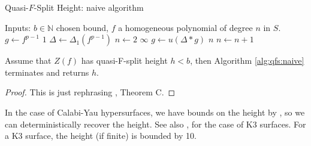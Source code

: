 \begin{algorithm}[H]
\caption{Quasi-\(F\)-Split Height: naive algorithm}
\label{alg:qfs:naive}
\begin{algorithmic}[1]
\State Inputs: \(b \in \mathbb{N}\) chosen bound, \(f\) a homogeneous
	polynomial of degree \(n\) in \(S\).
\State \(g \gets f^{p-1}\) 
    \State \Return \(1\) 
\EndIf
\State \(\Delta \gets \Delta_{1}(f^{p-1})\) 
\State \(n \gets 2\) 
        \State \Return \(\infty\)
    \EndIf
    \State \(g \gets u(\Delta * g)\) 
        \State \Return \(n\) 
    \EndIf
    \State \(n \gets n + 1\)
\EndWhile
\end{algorithmic}
\end{algorithm}

%

\begin{thm}
	Assume that
	\(Z(f)\) has quasi-F-split height \(h < b\),
	then Algorithm \ref{alg:qfs:naive} terminates
	and returns \(h\).
\end{thm}

\begin{proof}
	This is just rephrasing \cite{kty-2022-fedder}, Theorem C.
\end{proof}

In the case of Calabi-Yau hypersurfaces, we have bounds on the height by
\cite{van-der-geer-katsura-2003-calabi-yau},
so we can deterministically recover the height.  
See also \cite[Theorem~0.1]{artin-1974-k3-surfaces},
for the case of K3 surfaces.
For a K3 surface, the height (if finite) is bounded by 10.

